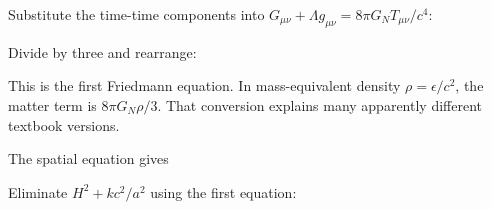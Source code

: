 \documentclass[
  11pt,
  letterpaper,
  oneside,
  openany]{scrbook}
\begin{document}
\begin{center}
\begingroup
{}
\ifdim\wd\grmathbox>\linewidth
\resizebox{\linewidth}{!}{\usebox{\grmathbox}}
\else\usebox{\grmathbox}\fi
\endgroup
\end{center}

Substitute the time-time components into
\(G_{\mu\nu}+\Lambda g_{\mu\nu}=8\pi G_NT_{\mu\nu}/c^4\):

\begin{center}
\begingroup
{}
\ifdim\wd\grmathbox>\linewidth
\resizebox{\linewidth}{!}{\usebox{\grmathbox}}
\else\usebox{\grmathbox}\fi
\endgroup
\end{center}

Divide by three and rearrange:

\begin{center}
\begingroup
{}
\ifdim\wd\grmathbox>\linewidth
\resizebox{\linewidth}{!}{\usebox{\grmathbox}}
\else\usebox{\grmathbox}\fi
\endgroup
\end{center}

This is the first Friedmann equation. In mass-equivalent density
\(\rho=\epsilon/c^2\), the matter term is \(8\pi G_N\rho/3\). That
conversion explains many apparently different textbook versions.

The spatial equation gives

\begin{center}
\begingroup
{}
\ifdim\wd\grmathbox>\linewidth
\resizebox{\linewidth}{!}{\usebox{\grmathbox}}
\else\usebox{\grmathbox}\fi
\endgroup
\end{center}

Eliminate \(H^2+kc^2/a^2\) using the first equation:

\begin{center}
\begingroup
{}
\ifdim\wd\grmathbox>\linewidth
\resizebox{\linewidth}{!}{\usebox{\grmathbox}}
\else\usebox{\grmathbox}\fi
\endgroup
\end{center}
\end{document}
